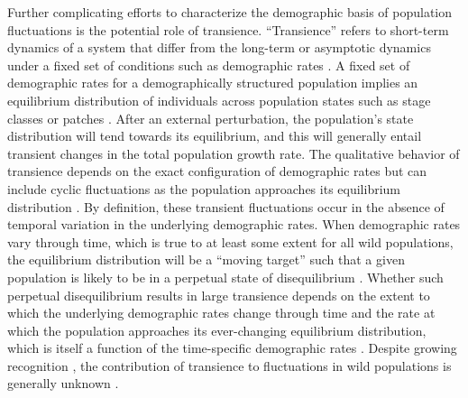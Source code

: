 \documentclass[11pt]{article}
\begin{document}
Further complicating efforts to characterize the demographic basis 
of population fluctuations is the potential role of transience.
``Transience'' refers to short-term dynamics of a system 
that differ from the long-term or asymptotic dynamics under a fixed set of conditions
such as demographic rates
\citep{hastings2010}.
A fixed set of demographic rates for a demographically structured population 
implies an equilibrium distribution
of individuals across population states such as stage classes or patches
\citep{caswell2001matrix}.
After an external perturbation, 
the population's state distribution will tend towards its equilibrium,
and this will generally entail transient changes 
in the total population growth rate.
The qualitative behavior of transience depends
on the exact configuration of demographic rates
but can include cyclic fluctuations 
as the population approaches its equilibrium distribution
\citep{caswell2001matrix}.
By definition, these transient fluctuations occur in the absence 
of temporal variation in the underlying demographic rates.
When demographic rates vary through time,
which is true to at least some extent for all wild populations,
the equilibrium distribution will be a ``moving target''
such that a given population is likely to be in a perpetual state of disequilibrium
\citep{fox2000population, koons2017understanding}.
Whether such perpetual disequilibrium results in large transience 
depends on the extent to which the underlying demographic rates change through time
and the rate at which the population approaches its ever-changing equilibrium distribution,
which is itself a function of the time-specific demographic rates
\citep{caswell2005reactivity, caswell2007sensitivity}.
Despite growing recognition
\citep{caswell2007sensitivity, koons2017understanding},
the contribution of transience to fluctuations in wild populations is generally unknown
\citep[but see][]{hoy2020fluctuations}.
\end{document}
